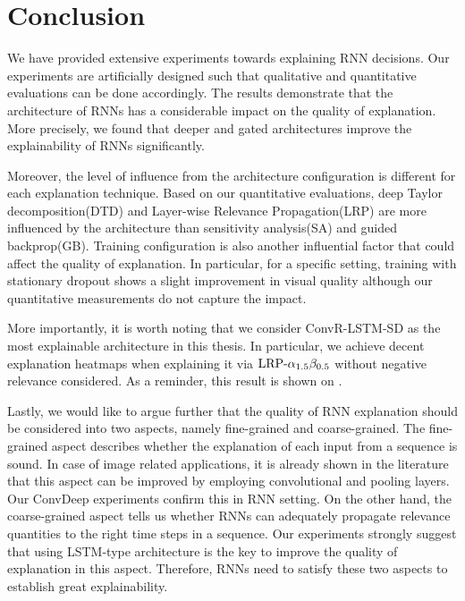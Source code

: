 \chapter{Conclusion}
\label{cha:chapter5}
We have provided extensive experiments towards explaining RNN decisions. Our experiments are artificially designed such that qualitative and quantitative evaluations can be done accordingly.  The results demonstrate that the architecture of RNNs has a considerable impact on the quality of explanation. More precisely, we found that deeper and gated architectures improve the explainability of RNNs significantly. 

Moreover, the level of influence from the architecture configuration is different for each explanation technique. Based on our quantitative evaluations, deep Taylor decomposition(DTD) and Layer-wise Relevance Propagation(LRP) are more influenced by the architecture than sensitivity analysis(SA) and guided backprop(GB).  Training configuration is also another influential factor that could affect the quality of explanation. In particular, for a specific setting, training with stationary dropout shows a slight improvement in visual quality although our quantitative measurements do not capture the impact.

More importantly, it is worth noting that we consider ConvR-LSTM-SD as the most explainable architecture in this thesis. In particular, we achieve decent explanation heatmaps when explaining it via $\text{LRP-}\alpha_{1.5}\beta_{0.5}$ without negative relevance considered. As a reminder, this result is shown on \addfigure{\ref{fig:heatmap_msc_convrlstm_pos_rel}}.

Lastly, we would like to argue further that the quality of RNN explanation should be considered into two aspects, namely fine-grained and coarse-grained.  The fine-grained aspect describes whether the explanation of each input from a sequence is sound. In case of image related applications, it is already shown in the literature that this aspect can be improved by employing convolutional and pooling layers. Our ConvDeep experiments confirm this in RNN setting. On the other hand, the coarse-grained aspect tells us whether RNNs can adequately propagate relevance quantities to the right time steps in a sequence. Our experiments strongly suggest that using LSTM-type architecture is the key to improve the quality of explanation in this aspect. Therefore, RNNs need to satisfy these two aspects to establish great explainability.



